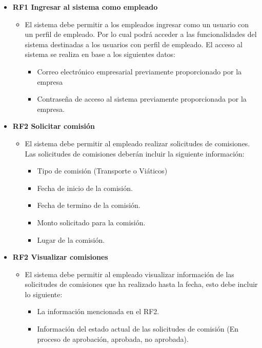 \begin{itemize}
	\item \textbf{RF1 Ingresar al sistema como empleado}
	\begin{itemize}
		\item El sistema debe permitir a los empleados ingresar como un usuario con un perfil de empleado. Por lo cual podrá acceder a las funcionalidades del sistema destinadas a los usuarios con perfil de empleado. El acceso al sistema se realiza en base a los siguientes datos:
		\begin{itemize}
			\item Correo electrónico empresarial previamente proporcionado por la empresa
			\item Contraseña de acceso al sistema previamente proporcionada por la empresa.
		\end{itemize}
	\end{itemize}
	
	\item \textbf{RF2 Solicitar comisión}
	\begin{itemize}
		\item El sistema debe permitir al empleado realizar solicitudes de comisiones. Las solicitudes de comisiones deberán incluir la siguiente información:
		\begin{itemize}
			\item Tipo de comisión (Transporte o Viáticos)
			\item Fecha de inicio de la comisión.
			\item Fecha de termino de la comisión.
			\item Monto solicitado para la comisión.
			\item Lugar de la comisión.
		\end{itemize}
	\end{itemize}
	
	\item \textbf{RF2 Visualizar comisiones}
	\begin{itemize}
		\item El sistema debe permitir al empleado visualizar información de las solicitudes de comisiones que ha realizado hasta la fecha, esto debe incluir lo siguiente: 
		\begin{itemize}
			\item La información mencionada en el RF2.
			\item Información del estado actual de las solicitudes de comisión (En proceso de aprobación, aprobada, no aprobada).
		\end{itemize}
	\end{itemize}


\end{itemize}
